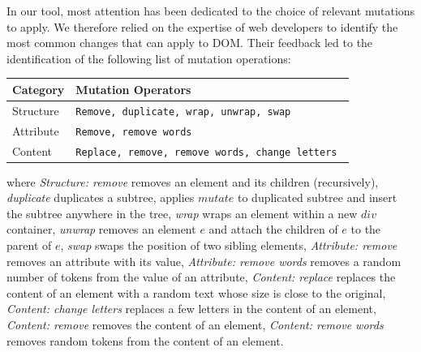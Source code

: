In our tool, most attention has been dedicated to the choice of relevant mutations to apply.
We therefore relied on the expertise of web developers to identify the most common changes that can apply to DOM.
Their feedback led to the identification of the following list of mutation operations:

\begin{center}
    \begin{table}[h]
    \begin{tabular}{l|l}
    \hline
    Category  & Mutation Operators                       \\ \hline
    Structure & \tt Remove, duplicate, wrap, unwrap, swap    \\
    Attribute & \tt Remove, remove words                     \\
    Content   & \tt Replace, remove, remove words, change letters \\ \hline
    \end{tabular}
    \end{table}
\end{center}
where
\textit{Structure: remove} removes an element and its children (recursively), 
\textit{duplicate} duplicates a subtree, applies $mutate$ to duplicated subtree and insert the subtree anywhere in the tree,
\textit{wrap} wraps an element within a new $div$ container,
\textit{unwrap} removes an element $e$ and attach the children of $e$ to the parent of $e$,
\textit{swap} swaps the position of two sibling elements,
\textit{Attribute: remove} removes an attribute with its value,
\textit{Attribute: remove words} removes a random number of tokens from the value of an attribute,
\textit{Content: replace} replaces the content of an element with a random text whose size is close to the original,
\textit{Content: change letters} replaces a few letters in the content of an element,
\textit{Content: remove} removes the content of an element,
\textit{Content: remove words} removes random tokens from the content of an element.

